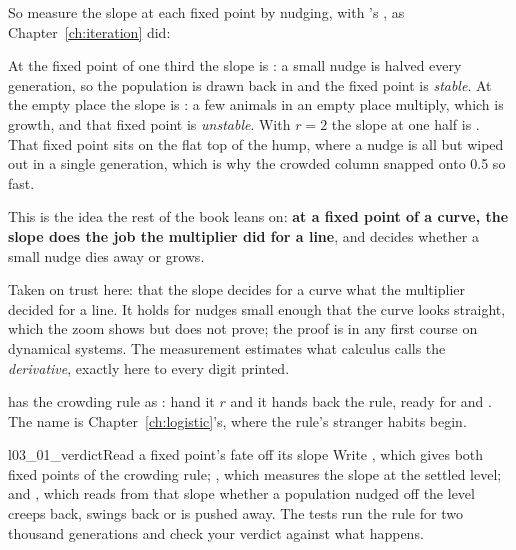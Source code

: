\noindent
So measure the slope at each fixed point by nudging, with 's
, as Chapter~\ref{ch:iteration} did:



\noindent
At the fixed point of one third the slope is : a
small nudge is halved every generation, so the population is drawn back in
and the fixed point is \emph{stable}. At the empty place the slope is
: a few animals in an empty place multiply, which is
growth, and that fixed point is \emph{unstable}. With $r = 2$ the slope at
one half is . That fixed point sits on the flat top of
the hump, where a nudge is all but wiped out in a single generation, which is
why the crowded column snapped onto \num{0.5} so fast.

This is the idea the rest of the book leans on: \textbf{at a fixed point
of a curve, the slope does the job the multiplier did for a line}, and
decides whether a small nudge dies away or grows.

\begin{rigourbox}
Taken on trust here: that the slope decides for a curve what the
multiplier decided for a line. It holds for nudges small enough that the
curve looks straight, which the zoom shows but does not prove; the proof is
in any first course on dynamical systems. The measurement estimates what
calculus calls the \emph{derivative}, exactly here to every digit printed.
\end{rigourbox}

\begin{projectbox}
 has the crowding rule as : hand it $r$ and it
hands back the rule, ready for  and . The name is
Chapter~\ref{ch:logistic}'s, where the rule's stranger habits begin.
\end{projectbox}

\begin{lab}{l03_01_verdict}{Read a fixed point's fate off its slope}
Write , which gives both fixed points of the crowding
rule; , which measures the slope at the settled level;
and , which reads from that slope whether a population nudged
off the level creeps back, swings back or is pushed away. The tests run the
rule for two thousand generations and check your verdict against what
happens.
\end{lab}

